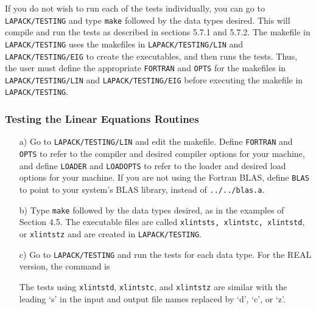 If you do not wish to run each of the tests individually, you can
go to {\tt LAPACK/TESTING}
and type {\tt make} followed by the data types desired.  This will
compile and run the tests as described in sections 5.7.1 and 5.7.2.
The makefile in {\tt LAPACK/TESTING} uses the makefiles in 
{\tt LAPACK/TESTING/LIN} and {\tt LAPACK/TESTING/EIG} to create the
executables, and then runs the tests.  Thus,
the user must define the appropriate {\tt FORTRAN} and {\tt OPTS} for
the makefiles in {\tt LAPACK/TESTING/LIN} and {\tt LAPACK/TESTING/EIG}
before executing the makefile in {\tt LAPACK/TESTING}.

\subsubsection{Testing the Linear Equations Routines}

\begin{itemize}

\item[a)]
Go to {\tt LAPACK/TESTING/LIN} and edit the makefile.
Define {\tt FORTRAN} and {\tt OPTS} to refer to the compiler and desired compiler
options for your machine, and define {\tt LOADER} and {\tt LOADOPTS} to refer to
the loader and desired load options for your machine.
If you are not using the Fortran BLAS, define {\tt BLAS} to point to
your system's BLAS library, instead of {\tt ../../blas.a}.

\item[b)]
Type {\tt make} followed by the data types desired, as in the examples
of Section 4.5.  The executable files are called {\tt xlintsts, xlintstc,
xlintstd}, or {\tt xlintstz} and are created in {\tt LAPACK/TESTING}.

\item[c)]
Go to {\tt LAPACK/TESTING} and run the tests for each data type.
For the REAL version, the command is

\noindent
The tests using {\tt xlintstd}, {\tt xlintstc}, and {\tt xlintstz} are similar
with the leading `s' in the input and output file names replaced
by `d', `c', or `z'.


\end{itemize}

